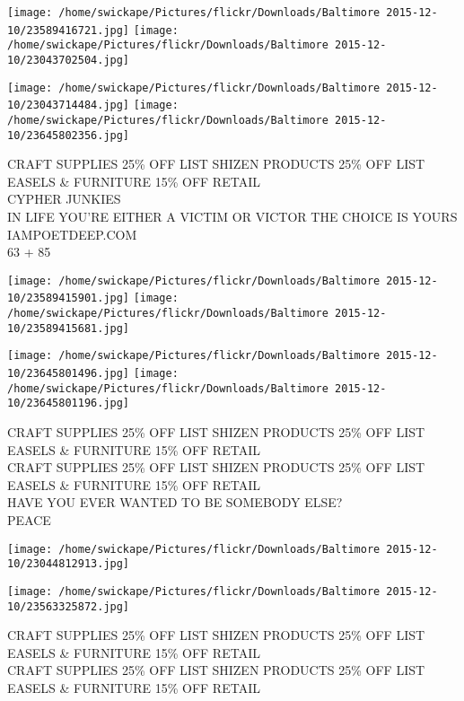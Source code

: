 \documentclass[10pt,letterpaper]{article}
\begin{document}
\texttt{[image: /home/swickape/Pictures/flickr/Downloads/Baltimore 2015-12-10/23589416721.jpg]}
\texttt{[image: /home/swickape/Pictures/flickr/Downloads/Baltimore 2015-12-10/23043702504.jpg]}

\texttt{[image: /home/swickape/Pictures/flickr/Downloads/Baltimore 2015-12-10/23043714484.jpg]}
\texttt{[image: /home/swickape/Pictures/flickr/Downloads/Baltimore 2015-12-10/23645802356.jpg]}

CRAFT SUPPLIES 25\% OFF LIST SHIZEN PRODUCTS 25\% OFF LIST EASELS \& FURNITURE 15\% OFF RETAIL\\
CYPHER JUNKIES\\
IN LIFE YOU'RE EITHER A VICTIM OR VICTOR THE CHOICE IS YOURS IAMPOETDEEP.COM\\
63 + 85\\
\pagebreak

\texttt{[image: /home/swickape/Pictures/flickr/Downloads/Baltimore 2015-12-10/23589415901.jpg]}
\texttt{[image: /home/swickape/Pictures/flickr/Downloads/Baltimore 2015-12-10/23589415681.jpg]}

\texttt{[image: /home/swickape/Pictures/flickr/Downloads/Baltimore 2015-12-10/23645801496.jpg]}
\texttt{[image: /home/swickape/Pictures/flickr/Downloads/Baltimore 2015-12-10/23645801196.jpg]}

CRAFT SUPPLIES 25\% OFF LIST SHIZEN PRODUCTS 25\% OFF LIST EASELS \& FURNITURE 15\% OFF RETAIL\\
CRAFT SUPPLIES 25\% OFF LIST SHIZEN PRODUCTS 25\% OFF LIST EASELS \& FURNITURE 15\% OFF RETAIL\\
HAVE YOU EVER WANTED TO BE SOMEBODY ELSE?\\
PEACE\\
\pagebreak

\texttt{[image: /home/swickape/Pictures/flickr/Downloads/Baltimore 2015-12-10/23044812913.jpg]}

\vspace{0.25in}
\texttt{[image: /home/swickape/Pictures/flickr/Downloads/Baltimore 2015-12-10/23563325872.jpg]}

CRAFT SUPPLIES 25\% OFF LIST SHIZEN PRODUCTS 25\% OFF LIST EASELS \& FURNITURE 15\% OFF RETAIL\\
CRAFT SUPPLIES 25\% OFF LIST SHIZEN PRODUCTS 25\% OFF LIST EASELS \& FURNITURE 15\% OFF RETAIL\\
\pagebreak
\end{document}
